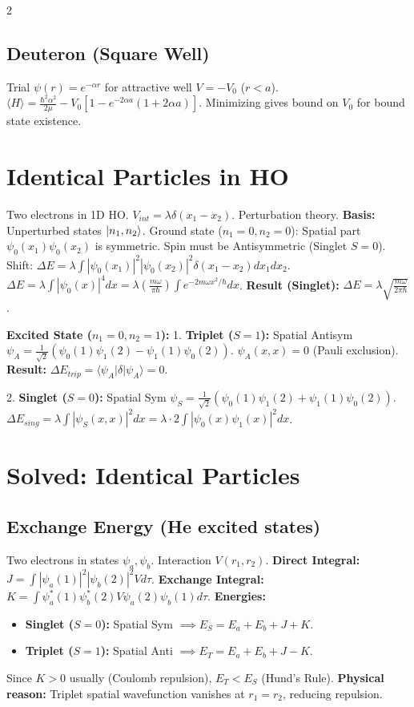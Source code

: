 \documentclass[9pt,a4paper]{article} %
\begin{document}
\begin{multicols}{2}
\subsection{ Deuteron (Square Well)}
Trial $\psi(r) = e^{-\alpha r}$ for attractive well $V=-V_0$ ($r<a$).
$\langle H \rangle = \frac{\hbar^2 \alpha^2}{2\mu} - V_0 [1 - e^{-2\alpha a}(1+2\alpha a)]$.
Minimizing gives bound on $V_0$ for bound state existence.
\section{ Identical Particles in HO}

Two electrons in 1D HO. $V_{int} = \lambda \delta(x_1 - x_2)$. Perturbation theory.
\textbf{Basis:} Unperturbed states $\ket{n_1, n_2}$.
Ground state ($n_1=0, n_2=0$): Spatial part $\psi_0(x_1)\psi_0(x_2)$ is symmetric.
Spin must be Antisymmetric (Singlet $S=0$).
Shift: $\Delta E = \lambda \int |\psi_0(x_1)|^2 |\psi_0(x_2)|^2 \delta(x_1-x_2) dx_1 dx_2$.
$\Delta E = \lambda \int |\psi_0(x)|^4 dx = \lambda (\frac{m\omega}{\pi\hbar}) \int e^{-2m\omega x^2/\hbar} dx$.
\textbf{Result (Singlet):} $\Delta E = \lambda \sqrt{\frac{m\omega}{2\pi\hbar}}$.

\textbf{Excited State ($n_1=0, n_2=1$):}
1. \textbf{Triplet ($S=1$):} Spatial Antisym $\psi_A = \frac{1}{\sqrt{2}}(\psi_0(1)\psi_1(2) - \psi_1(1)\psi_0(2))$.
$\psi_A(x,x) = 0$ (Pauli exclusion).
\textbf{Result:} $\Delta E_{trip} = \langle \psi_A | \delta | \psi_A \rangle = 0$.

2. \textbf{Singlet ($S=0$):} Spatial Sym $\psi_S = \frac{1}{\sqrt{2}}(\psi_0(1)\psi_1(2) + \psi_1(1)\psi_0(2))$.
$\Delta E_{sing} = \lambda \int |\psi_S(x,x)|^2 dx = \lambda \cdot 2 \int |\psi_0(x)\psi_1(x)|^2 dx$.
\section{ Solved: Identical Particles}

\subsection{ Exchange Energy (He excited states)}
Two electrons in states $\psi_a, \psi_b$. Interaction $V(r_1, r_2)$.
\textbf{Direct Integral:} $J = \int |\psi_a(1)|^2 |\psi_b(2)|^2 V d\tau$.
\textbf{Exchange Integral:} $K = \int \psi_a^*(1)\psi_b^*(2) V \psi_a(2)\psi_b(1) d\tau$.
\textbf{Energies:}
\begin{itemize}
    \item \textbf{Singlet ($S=0$):} Spatial Sym $\implies E_S = E_a + E_b + J + K$.
    \item \textbf{Triplet ($S=1$):} Spatial Anti $\implies E_T = E_a + E_b + J - K$.
\end{itemize}
Since $K > 0$ usually (Coulomb repulsion), $E_T < E_S$ (Hund's Rule).
\textbf{Physical reason:} Triplet spatial wavefunction vanishes at $r_1=r_2$, reducing repulsion.


\end{multicols}
\end{document}
